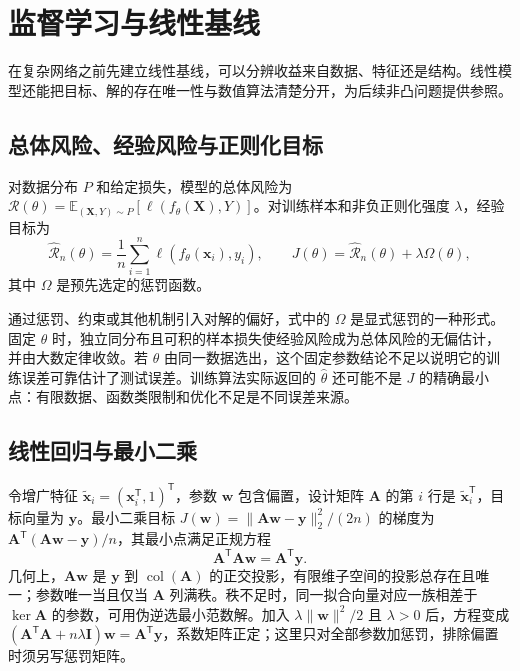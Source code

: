 \documentclass[UTF8,12pt,a4paper,fontset=fandol]{ctexbook}
\begin{document}
\chapter{监督学习与线性基线}
\label{chap:dl-baselines}
在复杂网络之前先建立线性基线，可以分辨收益来自数据、特征还是结构。线性模型还能把目标、解的存在唯一性与数值算法清楚分开，为后续非凸问题提供参照。

\section{总体风险、经验风险与正则化目标}
\begin{definition}[风险与经验风险]
对数据分布 $P$ 和给定损失，模型的总体风险为 $\mathcal R(\theta)=\mathbb E_{(\mathbf X,Y)\sim P}[\ell(f_\theta(\mathbf X),Y)]$。对训练样本和非负正则化强度 $\lambda$，经验目标为
\begin{equation}
\widehat{\mathcal R}_n(\theta)=\frac1n\sum_{i=1}^n\ell(f_\theta(\mathbf x_i),y_i),
\qquad J(\theta)=\widehat{\mathcal R}_n(\theta)+\lambda\Omega(\theta),
\label{eq:dl-empirical-objective}
\end{equation}
其中 $\Omega$ 是预先选定的惩罚函数。
\end{definition}
通过惩罚、约束或其他机制引入对解的偏好，式中的 $\Omega$ 是显式惩罚的一种形式。固定 $\theta$ 时，独立同分布且可积的样本损失使经验风险成为总体风险的无偏估计，并由大数定律收敛。若 $\theta$ 由同一数据选出，这个固定参数结论不足以说明它的训练误差可靠估计了测试误差。训练算法实际返回的 $\widehat\theta$ 还可能不是 $J$ 的精确最小点：有限数据、函数类限制和优化不足是不同误差来源。

\section{线性回归与最小二乘}
令增广特征 $\widetilde{\mathbf x}_i=(\mathbf x_i^\mathsf T,1)^\mathsf T$，参数 $\mathbf w$ 包含偏置，设计矩阵 $\mathbf A$ 的第 $i$ 行是 $\widetilde{\mathbf x}_i^\mathsf T$，目标向量为 $\mathbf y$。最小二乘目标 $J(\mathbf w)=\|\mathbf A\mathbf w-\mathbf y\|_2^2/(2n)$ 的梯度为 $\mathbf A^\mathsf T(\mathbf A\mathbf w-\mathbf y)/n$，其最小点满足正规方程
\begin{equation}
\mathbf A^\mathsf T\mathbf A\mathbf w=\mathbf A^\mathsf T\mathbf y.
\label{eq:dl-normal-equations}
\end{equation}
几何上，$\mathbf A\mathbf w$ 是 $\mathbf y$ 到 $\operatorname{col}(\mathbf A)$ 的正交投影，有限维子空间的投影总存在且唯一；参数唯一当且仅当 $\mathbf A$ 列满秩。秩不足时，同一拟合向量对应一族相差于 $\ker\mathbf A$ 的参数，可用伪逆选最小范数解。加入 $\lambda\|\mathbf w\|^2/2$ 且 $\lambda>0$ 后，方程变成 $(\mathbf A^\mathsf T\mathbf A+n\lambda\mathbf I)\mathbf w=\mathbf A^\mathsf T\mathbf y$，系数矩阵正定；这里只对全部参数加惩罚，排除偏置时须另写惩罚矩阵。
\end{document}
